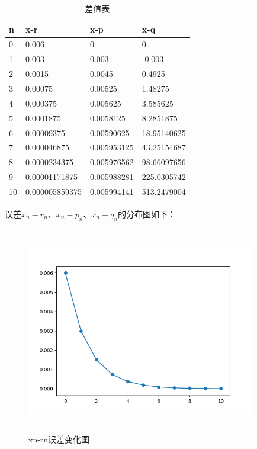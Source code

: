 \documentclass[UTF8]{ctexart}
\begin{document}
\begin{table}[H]

\caption{差值表}
\begin{tabular}{|l|l|l|l|}
\hline

n & x-r & x-p & x-q \\ \hline
0 & 0.006 & 0 & 0 \\ \hline
1 & 0.003 & 0.003 & -0.003 \\ \hline
2 & 0.0015 & 0.0045 & 0.4925 \\ \hline
3 & 0.00075 & 0.00525 & 1.48275 \\ \hline
4 & 0.000375 & 0.005625 & 3.585625 \\ \hline
5 & 0.0001875 & 0.0058125 & 8.2851875 \\ \hline
6 & 0.00009375 & 0.00590625 & 18.95140625 \\ \hline
7 & 0.000046875 & 0.005953125 & 43.25154687 \\ \hline
8 & 0.0000234375 & 0.005976562 & 98.66097656 \\ \hline
9 & 0.00001171875 & 0.005988281 & 225.0305742 \\ \hline
10 & 0.000005859375 & 0.005994141 & 513.2479004 \\ \hline

\end{tabular}
\end{table}



误差$ x_n-r_n$、$ x_n-p_n$、$ x_n-q_n$的分布图如下：

\begin{figure}[H]
 \centering
  \includegraphics[width=10cm,height=9cm]{1-2-1.png}
  \caption{xn-rn误差变化图}
\end{figure}
\end{document}

